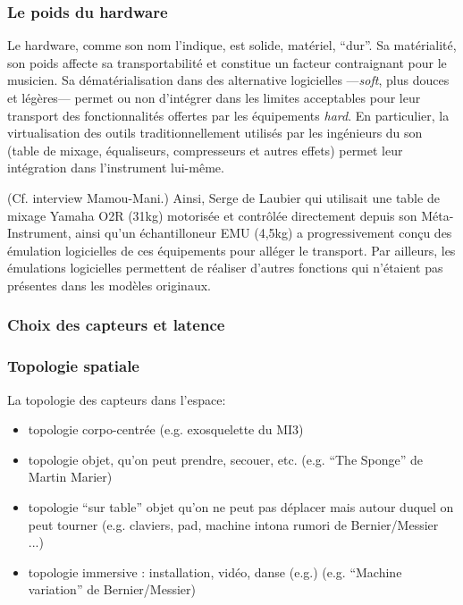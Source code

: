 \subsubsection{Le poids du hardware}

\noindent Le hardware, comme son nom l'indique, est solide, matériel, ``dur''. Sa matérialité, son poids affecte sa transportabilité et constitue un facteur contraignant pour le musicien. Sa dématérialisation dans des alternative logicielles —\textit{soft}, plus douces et légères— permet ou non d'intégrer dans les limites acceptables pour leur transport des fonctionnalités offertes par les équipements \textit{hard}.
En particulier, la virtualisation des outils traditionnellement utilisés par les ingénieurs du son (table de mixage, équaliseurs, compresseurs et autres effets) permet leur intégration dans l'instrument lui-même.

(Cf. interview Mamou-Mani.)
Ainsi, Serge de Laubier qui utilisait une table de mixage Yamaha O2R (31kg) motorisée et contrôlée directement depuis son Méta-Instrument, ainsi qu'un échantilloneur EMU (4,5kg) a progressivement conçu des émulation logicielles de ces équipements pour alléger le transport. Par ailleurs, les émulations logicielles permettent de réaliser d'autres fonctions qui n'étaient pas présentes dans les modèles originaux.


\subsubsection{Choix des capteurs et latence}




\subsubsection{Topologie spatiale}

La topologie des capteurs dans l'espace:
\vspace{-1em}
\begin{itemize}[noitemsep]
	\item topologie corpo-centrée (e.g. exosquelette du MI3)
	\item topologie objet, qu'on peut prendre, secouer, etc. (e.g. ``The Sponge'' de Martin Marier)
	\item topologie ``sur table'' objet qu'on ne peut pas déplacer mais autour duquel on peut tourner (e.g. claviers, pad, machine intona rumori de Bernier/Messier ...)
	\item topologie immersive : installation, vidéo, danse (e.g.) (e.g. ``Machine variation'' de Bernier/Messier)
\end{itemize}




